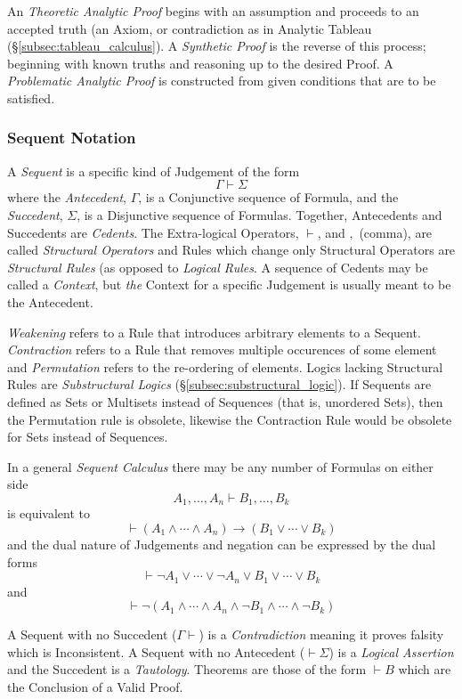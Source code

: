 \documentclass{article}
\begin{document}
An \emph{Theoretic Analytic Proof} begins with an assumption and
proceeds to an accepted truth (an Axiom, or contradiction as in
Analytic Tableau (\S\ref{subsec:tableau_calculus}). A \emph{Synthetic
  Proof} is the reverse of this process; beginning with known truths
and reasoning up to the desired Proof. A \emph{Problematic Analytic
  Proof} is constructed from given conditions that are to be
satisfied.

\subsubsection{Sequent Notation}\label{subsec:sequent_notation}

A \emph{Sequent} is a specific kind of Judgement of the form
\[\Gamma \vdash \Sigma \]
where the \emph{Antecedent}, $\Gamma$, is a Conjunctive sequence of
Formula, and the \emph{Succedent}, $\Sigma$, is a Disjunctive sequence
of Formulas. Together, Antecedents and Succedents are
\emph{Cedents}. The Extra-logical Operators, $\vdash$, and $,$
(comma), are called \emph{Structural Operators} and Rules which change
only Structural Operators are \emph{Structural Rules} (as opposed to
\emph{Logical Rules}. A sequence of Cedents may be called a
\emph{Context}, but \emph{the} Context for a specific Judgement is
usually meant to be the Antecedent.

\emph{Weakening} refers to a Rule that introduces arbitrary elements
to a Sequent. \emph{Contraction} refers to a Rule that removes
multiple occurences of some element and \emph{Permutation} refers to
the re-ordering of elements. Logics lacking Structural Rules are
\emph{Substructural Logics} (\S\ref{subsec:substructural_logic}). If
Sequents are defined as Sets or Multisets instead of Sequences (that
is, unordered Sets), then the Permutation rule is obsolete, likewise
the Contraction Rule would be obsolete for Sets instead of Sequences.

In a general \emph{Sequent Calculus} there may be any
number of Formulas on either side
\[
    A_1, \ldots, A_n \vdash B_1, \ldots, B_k
\]
is equivalent to
\[
    \vdash(A_1 \wedge \cdots \wedge A_n) \rightarrow (B_1 \vee \cdots \vee B_k)
\]
and the dual nature of Judgements and negation can be expressed by the
dual forms
\[
    \vdash \neg A_1 \vee \cdots \vee \neg A_n \vee B_1 \vee \cdots
    \vee B_k
\]
and
\[
    \vdash \neg(A_1 \wedge \cdots \wedge A_n \wedge \neg B_1 \wedge
    \cdots \wedge \neg B_k)
\]

A Sequent with no Succedent ($\Gamma \vdash$) is a
\emph{Contradiction} meaning it proves falsity which is
Inconsistent. A Sequent with no Antecedent ($\vdash \Sigma$) is a
\emph{Logical Assertion} and the Succedent is a
\emph{Tautology}. Theorems are those of the form $\vdash B$ which are
the Conclusion of a Valid Proof.
\end{document}
